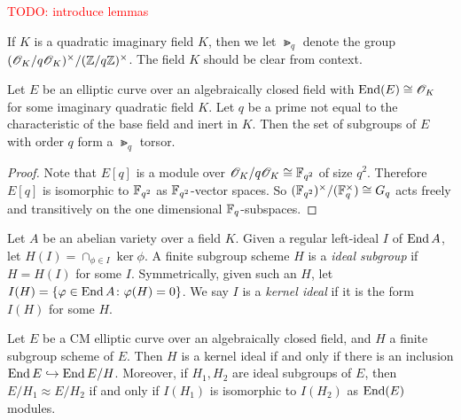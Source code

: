 \documentclass{amsart}
\begin{document}
\textcolor{red}{TODO: introduce lemmas}

\begin{definition}
  If $K$ is a quadratic imaginary field $K$, then we let $\Gt_q$ denote the group $(\mathscr{O}_K/q\mathscr{O}_K)^\times/(\mathbb{Z}/q\mathbb{Z})^\times$. The field $K$ should be clear from context.
\end{definition}

\begin{lemma}\label{lem:c-torsor}
  Let $E$ be an elliptic curve over an algebraically closed field with $\operatorname{End}(E) \cong \mathscr{O}_K$ for some imaginary quadratic field $K$. Let $q$ be a prime not equal to the characteristic of the base field and inert in $K$. Then the set of subgroups of $E$ with order $q$ form a $\Gt_q$ torsor.
\end{lemma}
\begin{proof}
  Note that $E[q]$ is a module over $\mathscr{O}_K/q\mathscr{O}_K \cong \mathbb{F}_{q^2}$  of size $q^2$. Therefore $E[q]$ is isomorphic to $\mathbb{F}_{q^2}$ as $\mathbb{F}_{q^2}$-vector spaces. So $(\mathbb{F}_{q^2})^\times/(\mathbb{F}_q^\times) \cong G_q$ acts freely and transitively on the one dimensional $\mathbb{F}_q$-subspaces.
\end{proof}

\begin{definition}\label{def:ker-idl}
  Let $A$ be an abelian variety over a field $K$. Given a regular left-ideal $I$ of $\operatorname{End} A$, let $H(I) = \cap_{\phi \in I}\ker \phi$. A finite subgroup scheme $H$ is a \emph{ideal subgroup} if $H = H(I)$ for some $I$. Symmetrically, given such an $H$, let $I(H) = \{\varphi \in \operatorname{End} A \colon \varphi(H) = 0\}$. We say $I$ is a \emph{kernel ideal} if it is the form $I(H)$ for some $H$.
\end{definition}

\begin{theorem}\label{thm:kani-20b}
  Let $E$ be a CM elliptic curve over an algebraically closed field, and $H$ a finite subgroup scheme of $E$. Then $H$ is a kernel ideal if and only if there is an inclusion $\operatorname{End} E \hookrightarrow \operatorname{End} E/H$. Moreover, if $H_1,H_2$ are ideal subgroups of $E$, then $E/H_1 \approx E/H_2$ if and only if $I(H_1)$ is isomorphic to $I(H_2)$ as $\operatorname{End}(E)$ modules.
\end{theorem}
\end{document}
